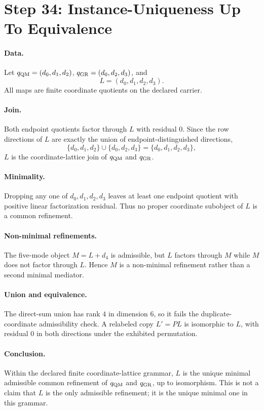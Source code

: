 \section*{Step 34: Instance-Uniqueness Up To Equivalence}

\paragraph{Data.}
Let \(q_{\rm QM}=(d_0,d_1,d_2)\), \(q_{\rm GR}=(d_0,d_2,d_3)\), and
\[
  L=(d_0,d_1,d_2,d_3).
\]
All maps are finite coordinate quotients on the declared carrier.

\paragraph{Join.}
Both endpoint quotients factor through \(L\) with residual \(0\).  Since the row directions of \(L\) are exactly the union of endpoint-distinguished directions,
\[
  \{d_0,d_1,d_2\}\cup\{d_0,d_2,d_3\}=\{d_0,d_1,d_2,d_3\},
\]
\(L\) is the coordinate-lattice join of \(q_{\rm QM}\) and \(q_{\rm GR}\).

\paragraph{Minimality.}
Dropping any one of \(d_0,d_1,d_2,d_3\) leaves at least one endpoint quotient with positive linear factorization residual.  Thus no proper coordinate subobject of \(L\) is a common refinement.

\paragraph{Non-minimal refinements.}
The five-mode object \(M=L+d_4\) is admissible, but \(L\) factors through \(M\) while \(M\) does not factor through \(L\).  Hence \(M\) is a non-minimal refinement rather than a second minimal mediator.

\paragraph{Union and equivalence.}
The direct-sum union has rank \(4\) in dimension \(6\), so it fails the duplicate-coordinate admissibility check.  A relabeled copy \(L'=PL\) is isomorphic to \(L\), with residual \(0\) in both directions under the exhibited permutation.

\paragraph{Conclusion.}
Within the declared finite coordinate-lattice grammar, \(L\) is the unique minimal admissible common refinement of \(q_{\rm QM}\) and \(q_{\rm GR}\), up to isomorphism.  This is not a claim that \(L\) is the only admissible refinement; it is the unique minimal one in this grammar.
